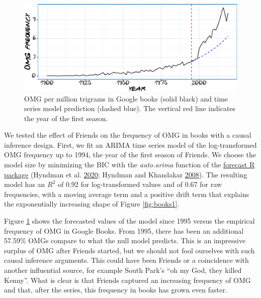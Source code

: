 \documentclass[]{article}
\begin{document}
\begin{figure}

{\centering \includegraphics{Friends_HPS_pdf_files/figure-latex/books2-1} 

}

\caption{OMG per million trigrams in Google books (solid black) and time series model prediction (dashed blue). The vertical red line indicates the year of the first season.}\label{fig:books2}
\end{figure}

We tested the effect of Friends on the frequency of OMG in books with a causal inference design. First, we fit an ARIMA time series model of the log-transformed OMG frequency up to 1994, the year of the first season of Friends. We choose the model size by minimizing the BIC with the \emph{auto.arima} function of the \href{https://cran.r-project.org/web/packages/forecast/index.html}{forecast R package} (Hyndman et al. \protect\hyperlink{ref-forecast1}{2020}; Hyndman and Khandakar \protect\hyperlink{ref-forecast2}{2008}). The resulting model has an \(R^2\) of 0.92
for log-transformed values and of 0.67 for raw frequencies, with a moving average term and a positive drift term that explains the exponentially increasing shape of Figure \ref{fig:books1}.

Figure \ref{fig:books2} shows the forecasted values of the model since 1995 versus the empirical frequency of OMG in Google Books.
From 1995, there has been an additional 57.59\% OMGs compare to what the null model predicts.
This is an impressive surplus of OMG after Friends started, but we should not fool ourselves with such causal inference arguments.
This could have been Friends or a coincidence with another influential source, for example South Park's ``oh my God, they killed Kenny''. What is clear is that Friends captured an increasing frequency of OMG and that, after the series, this frequency in books has grown even faster.
\end{document}
